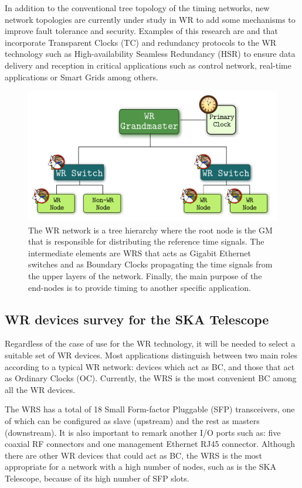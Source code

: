 In addition to the conventional tree topology of the timing networks, new
network topologies are currently under study in WR to add some mechanisms to improve fault
tolerance and security. Examples of this research are
\cite{jlgutierrez-paper-redundancy} and \cite{jlgutierrezhsr} that incorporate Transparent Clocks
(TC) and redundancy protocols to the WR technology such as
High-availability Seamless Redundancy (HSR) to ensure data delivery and reception in critical applications such as
control network, real-time applications or Smart Grids among others.

\begin{figure}[H] \centering \includegraphics[scale=0.4]{img/wr_hierarchy}
	\caption{The WR network is a tree hierarchy where the root node is the
	GM that is responsible for distributing the reference time signals. The intermediate elements are WRS that acts as Gigabit Ethernet switches and as Boundary Clocks propagating the time signals from the upper layers of the network. Finally, the main purpose of the end-nodes
	is to provide timing to another specific application.}
\label{fig:wr_hierarchy} \end{figure}

\subsection{WR devices survey for the SKA Telescope} \label{subsec:wr-dev}

Regardless of the case of use for the WR technology, it will be needed to select
a suitable set of WR devices. Most applications distinguish between two main roles
according to a typical WR network: devices which act as BC, and those that act as
Ordinary Clocks (OC). Currently, the WRS \cite{ohwr:wrs} is the most convenient
BC among all the WR devices. 

The WRS has a total of 18 Small Form-factor Pluggable (SFP) transceivers, one of which can be configured as slave (upstream) and the rest as masters (downstream). It is also important to remark another I/O ports such as: five coaxial RF connectors and one management Ethernet RJ45 connector. Although there are other WR devices that could act as BC, the WRS is the most appropriate for a network with a high number of nodes, such as is the SKA Telescope, because of its high number of SFP slots.

